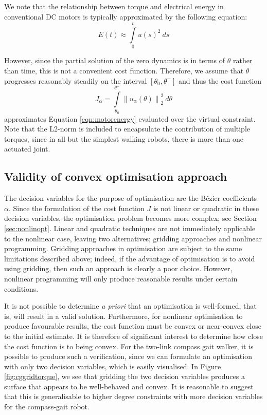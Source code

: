 We note that the relationship between torque and electrical energy in conventional DC motors is typically approximated by the following equation:
\begin{equation} \label{eqn:motorenergy}
	E(t) \approx \int\limits_0^t u(s)^2 ~ ds
\end{equation}

However, since the partial solution of the zero dynamics is in terms of $\theta$ rather than time, this is not a convenient cost function. Therefore, we assume that $\theta$ progresses reasonably steadily on the interval $[\theta_0,\theta^-]$ and thus the cost function
\begin{equation}
	J_\alpha = \int\limits_{\theta_0}^{\theta^-} \left\lVert u_\alpha(\theta) \right\rVert_2^2 ~ d\theta
\end{equation}
approximates Equation \ref{eqn:motorenergy} evaluated over the virtual constraint. Note that the L2-norm is included to encapsulate the contribution of multiple torques, since in all but the simplest walking robots, there is more than one actuated joint.

\subsection{Validity of convex optimisation approach}
The decision variables for the purpose of optimisation are the Bézier coefficients $\alpha$. Since the formulation of the cost function $J$ is not linear or quadratic in these decision variables, the optimisation problem becomes more complex; see Section \ref{sec:nonlinopt}. Linear and quadratic techniques are not immediately applicable to the nonlinear case, leaving two alternatives; gridding approaches and nonlinear programming. Gridding approaches in optimisation are subject to the same limitations described above; indeed, if the advantage of optimisation is to avoid using gridding, then such an approach is clearly a poor choice. However, nonlinear programming will only produce reasonable results under certain conditions.

It is not possible to determine \textit{a priori} that an optimisation is well-formed, that is, will result in a valid solution. Furthermore, for nonlinear optimisation to produce favourable results, the cost function must be convex or near-convex close to the initial estimate. It is therefore of significant interest to determine how close the cost function is to being convex. For the two-link compass gait walker, it is possible to produce such a verification, since we can formulate an optimisation with only two decision variables, which is easily visualised. In Figure \ref{fig:cggridtorque}, we see that gridding the two decision variables produces a surface that appears to be well-behaved and convex. It is reasonable to suggest that this is generalisable to higher degree constraints with more decision variables for the compass-gait robot.

